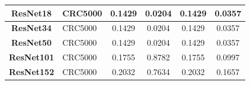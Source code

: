 \begin{table}[t!]
\begin{tabular}{|c|l|c|c|c|c|}
\textbf{ResNet18}     & CRC5000                                          & 0.1429        & 0.0204              & 0.1429           & 0.0357             \\ \hline
\textbf{ResNet34}    & CRC5000                                          & 0.1429        & 0.0204              & 0.1429           & 0.0357             \\ \hline
\textbf{ResNet50}    & CRC5000                                          & 0.1429        & 0.0204              & 0.1429           & 0.0357             \\ \hline
\textbf{ResNet101}    & CRC5000                                         & 0.1755        & 0.8782              & 0.1755           & 0.0997             \\ \hline
\textbf{ResNet152}    & CRC5000                                         & 0.2032        & 0.7634              & 0.2032           & 0.1657             \\ \hline
\end{tabular}

\end{table}



